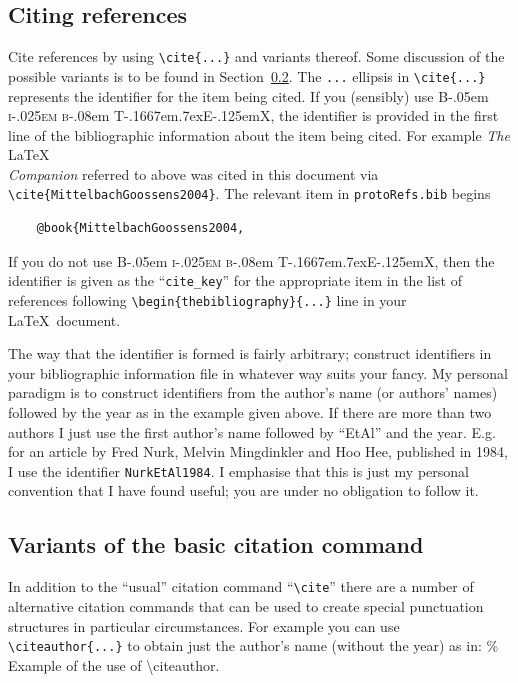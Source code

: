 \documentclass[
  times,
  doublespace]{anzsauth}
\newcommand\BibTeX{{\rmfamily B\kern-.05em \textsc{i\kern-.025em b}\kern-.08em
T\kern-.1667em\lower.7ex\hbox{E}\kern-.125emX}}
\begin{document}
\subsection{Citing references}\label{sec-citRef}

Cite references by using \texttt{\textbackslash{}cite\{...\}} and
variants thereof. Some discussion of the possible variants is to be
found in Section~\ref{sec-citeVar}. The \texttt{...} ellipsis in
\texttt{\textbackslash{}cite\{...\}} represents the identifier for the
item being cited. If you (sensibly) use \BibTeX, the identifier is
provided in the first line of the bibliographic information about the
item being cited. For example \emph{The} \LaTeX\\
\emph{Companion} referred to above was cited in this document via
\texttt{\textbackslash{}cite\{MittelbachGoossens2004\}}. The relevant
item in \texttt{protoRefs.bib} begins

\begin{verbatim}
    @book{MittelbachGoossens2004,
\end{verbatim}

If you do not use \BibTeX, then the identifier is given as the
``\texttt{cite\_key}'' for the appropriate item in the list of
references following
\texttt{\textbackslash{}begin\{thebibliography\}\{...\}} line in your
\LaTeX~document.

The way that the identifier is formed is fairly arbitrary; construct
identifiers in your bibliographic information file in whatever way suits
your fancy. My personal paradigm is to construct identifiers from the
author's name (or authors' names) followed by the year as in the example
given above. If there are more than two authors I just use the first
author's name followed by ``EtAl'' and the year. E.g. for an article by
Fred Nurk, Melvin Mingdinkler and Hoo Hee, published in 1984, I use the
identifier \texttt{NurkEtAl1984}. I emphasise that this is just my
personal convention that I have found useful; you are under no
obligation to follow it.

\subsection{Variants of the basic citation command}\label{sec-citeVar}

In addition to the ``usual'' citation command
``\texttt{\textbackslash{}cite}'' there are a number of alternative
citation commands that can be used to create special punctuation
structures in particular circumstances. For example you can use
\texttt{\textbackslash{}citeauthor\{...\}} to obtain just the author's
name (without the year) as in: \% Example of the use of
\textbackslash citeauthor.
\end{document}
